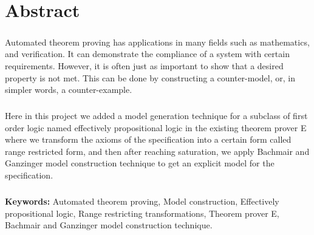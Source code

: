 \chapter*{Abstract}
\label{chap:abstract}


\begin{comment}
In the past few decades the field of automated theorem proving (ATP) has been flourishing and improving a lot by the enormous amount of research devoted to it. That interest came from its importance as well as its various uses in different fields such as mathematical reasoning.



ATP comes along with another process which is model generation/computation/construction from a certain (counter) satisfiable specification/problem. Model generation has usages that ATP alone wont have the effect that it has with it, and that could be noticed in Software/Hardware verification, debugging various systems.
\end{comment}



\paragraph{}
Automated theorem proving has applications in many fields such as mathematics, and verification. It can demonstrate the compliance of a system with certain requirements. However, it is often just as important to show that a desired property is not met. This can be done by constructing a counter-model, or, in simpler words, a counter-example.


\paragraph{}
Here in this project we added a model generation technique for a subclass of first order logic named effectively propositional logic in the existing theorem prover E where we transform the axioms of the specification into a certain form called range restricted form, and then after reaching saturation, we apply Bachmair and Ganzinger model construction technique to get an explicit model for the specification.


\paragraph{}
\textbf{Keywords:} Automated theorem proving, Model construction, Effectively propositional logic, Range restricting transformations, Theorem prover E, Bachmair and Ganzinger model construction technique.  